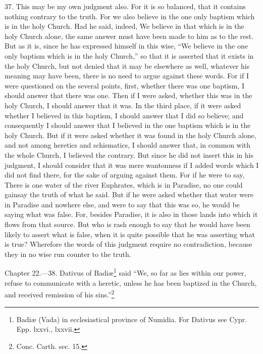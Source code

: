37. This may be my own judgment also. For it is so balanced, that it contains nothing contrary to the truth. For we also believe in the one only baptism which is in the holy Church. Had he said, indeed, We believe in that which is in the holy Church alone, the same answer must have been made to him as to the rest. But as it is, since he has expressed himself in this wise, ``We believe in the one only baptism which is in the holy Church,'' so that it is asserted that it exists in the holy Church, but not denied that it may be elsewhere as well, whatever his meaning may have been, there is no need to argue against these words. For if I were questioned on the several points, first, whether there was one baptism, I should answer that there was one. Then if I were asked, whether this was in the holy Church, I should answer that it was. In the third place, if it were asked whether I believed in this baptism, I should answer that I did so believe; and consequently I should answer that I believed in the one baptism which is in the holy Church. But if it were asked whether it was found in the holy Church alone, and not among heretics and schismatics, I should answer that, in common with the whole Church, I believed the contrary. But since he did not insert this in his judgment, I should consider that it was mere wantonness if I added words which I did not find there, for the sake of arguing against them. For if he were to say, There is one water of the river Euphrates, which is in Paradise, no one could gainsay the truth of what he said. But if he were asked whether that water were in Paradise and nowhere else, and were to say that this was so, he would be saying what was false. For, besides Paradise, it is also in those lands into which it flows from that source. But who is rash enough to say that he would have been likely to assert what is false, when it is quite possible that he was asserting what is true? Wherefore the words of this judgment require no contradiction, because they in no wise run counter to the truth.


Chapter 22.—38. Dativus of Badiæ\footnote{\par  Badiæ (Vada) in ecclesiastical province of Numidia. For Dativus see Cypr. Epp. lxxvi., lxxvii.} said ``We, so far as lies within our power, refuse to communicate with a heretic, unless he has been baptized in the Church, and received remission of his sins.''\footnote{\par  Conc. Carth. sec. 15.}

